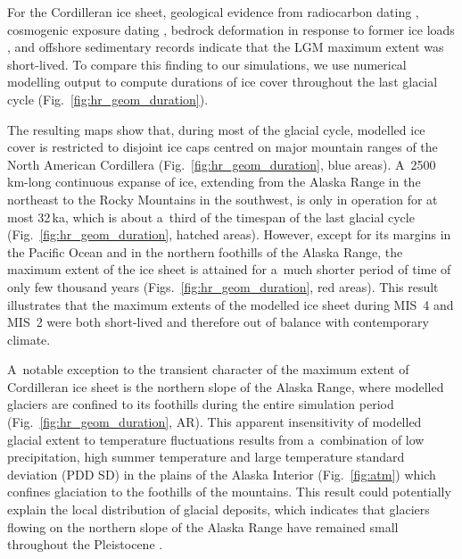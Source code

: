\documentclass[tc, manuscript]{copernicus}
\begin{document}
      For the Cordilleran ice sheet, geological evidence from radiocarbon
      dating \citep{Clague.etal.1980, Clague.1985, Clague.1986,
      Porter.Swanson.1998, Menounos.etal.2008}, cosmogenic exposure dating
      \citep{Stroeven.etal.2010, Stroeven.etal.2014, Margold.etal.2014},
      bedrock deformation in response to former ice loads
      \citep{Clague.James.2002, Clague.etal.2005}, and offshore sedimentary
      records \citep{Cosma.etal.2008, Davies.etal.2011} indicate that the
      LGM maximum extent was short-lived. To compare this finding to our
      simulations, we use numerical modelling output to compute durations of
      ice cover throughout the last glacial cycle
      (Fig.~\ref{fig:hr_geom_duration}).

      The resulting maps show that, during most of the glacial cycle,
      modelled ice cover is restricted to disjoint ice caps centred on major
      mountain ranges of the North American Cordillera
      (Fig.~\ref{fig:hr_geom_duration}, blue areas). A~2500\,\unit{km}-long
      continuous expanse of ice, extending from the Alaska Range in the
      northeast to the Rocky Mountains in the southwest, is only in
      operation for at most 32\,\unit{ka}, which is about a~third of the
      timespan of the last glacial cycle (Fig.~\ref{fig:hr_geom_duration},
      hatched areas). However, except for its margins in the Pacific Ocean
      and in the northern foothills of the Alaska Range, the maximum extent
      of the ice sheet is attained for a~much shorter period of time of only
      few thousand years (Figs.~\ref{fig:hr_geom_duration}, red areas). This
      result illustrates that the maximum extents of the modelled ice sheet
      during MIS~4 and MIS~2 were both short-lived and therefore out of
      balance with contemporary climate.

      A~notable exception to the transient character of the maximum extent
      of Cordilleran ice sheet is the northern slope of the Alaska Range,
      where modelled glaciers are confined to its foothills during the
      entire simulation period (Fig.~\ref{fig:hr_geom_duration}, AR). This
      apparent insensitivity of modelled glacial extent to temperature
      fluctuations results from a~combination of low precipitation, high
      summer temperature and large temperature standard deviation (PDD SD)
      in the plains of the Alaska Interior (Fig.~\ref{fig:atm}) which
      confines glaciation to the foothills of the mountains. This result
      could potentially explain the local distribution of glacial deposits,
      which indicates that glaciers flowing on the northern slope of the
      Alaska Range have remained small throughout the Pleistocene
      \citep{Kaufman.Manley.2004}.
\end{document}
